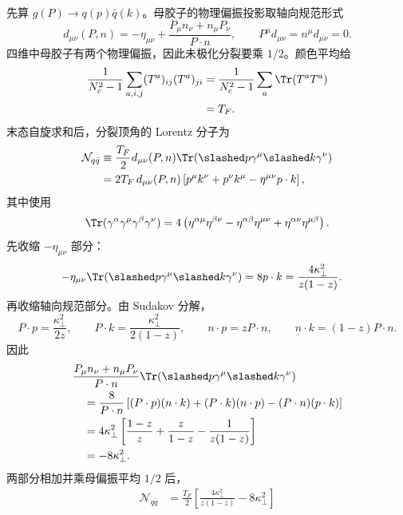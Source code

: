\begin{derivation}[最低阶部分子分裂核]
先算 $g(P)\to q(p)\bar q(k)$。母胶子的物理偏振投影取轴向规范形式
\begin{equation*}
 d_{\mu\nu}(P,n)
 =-\eta_{\mu\nu}
 +\frac{P_\mu n_\nu+n_\mu P_\nu}{P\cdot n},
 \qquad
 P^\mu d_{\mu\nu}=n^\mu d_{\mu\nu}=0.
\end{equation*}
四维中母胶子有两个物理偏振，因此未极化分裂要乘 $1/2$。颜色平均给
\begin{align*}
 \frac1{N_c^2-1}\sum_{a,i,j}
 (T^a)_{ij}(T^a)_{ji}
 &=\frac1{N_c^2-1}\sum_a\Tr(T^aT^a)\\
 &=T_F.
\end{align*}
末态自旋求和后，分裂顶角的 Lorentz 分子为
\begin{align*}
 \mathcal N_{q\bar q}
 &\equiv\frac{T_F}{2}
 d_{\mu\nu}(P,n)
 \Tr\!\left(\slashed p\gamma^\mu\slashed k\gamma^\nu\right)\\
 &=2T_F\,d_{\mu\nu}(P,n)
 \left[p^\mu k^\nu+p^\nu k^\mu
 -\eta^{\mu\nu}p\cdot k\right],
\end{align*}
其中使用
\begin{equation*}
 \Tr(\gamma^\alpha\gamma^\mu\gamma^\beta\gamma^\nu)
 =4\left(
 \eta^{\alpha\mu}\eta^{\beta\nu}
 -\eta^{\alpha\beta}\eta^{\mu\nu}
 +\eta^{\alpha\nu}\eta^{\mu\beta}
 \right).
\end{equation*}
先收缩 $-\eta_{\mu\nu}$ 部分：
\begin{align*}
 -\eta_{\mu\nu}
 \Tr(\slashed p\gamma^\mu\slashed k\gamma^\nu)
 &=8p\cdot k
 =\frac{4\kappa_\perp^2}{z(1-z)}.
\end{align*}
再收缩轴向规范部分。由 Sudakov 分解，
\begin{equation*}
 P\cdot p=\frac{\kappa_\perp^2}{2z},\qquad
 P\cdot k=\frac{\kappa_\perp^2}{2(1-z)},\qquad
 n\cdot p=zP\cdot n,\qquad
 n\cdot k=(1-z)P\cdot n.
\end{equation*}
因此
\begin{align*}
 &\frac{P_\mu n_\nu+n_\mu P_\nu}{P\cdot n}
 \Tr(\slashed p\gamma^\mu\slashed k\gamma^\nu)\\
 &\quad=\frac{8}{P\cdot n}
 \left[(P\cdot p)(n\cdot k)
 +(P\cdot k)(n\cdot p)
 -(P\cdot n)(p\cdot k)\right]\\
 &\quad=4\kappa_\perp^2
 \left[\frac{1-z}{z}+\frac{z}{1-z}
 -\frac1{z(1-z)}\right]\\
 &\quad=-8\kappa_\perp^2.
\end{align*}
两部分相加并乘母偏振平均 $1/2$ 后，
\begin{align*}
 \mathcal N_{q\bar q}
 &=\frac{T_F}{2}
 \left[
 \frac{4\kappa_\perp^2}{z(1-z)}
 -8\kappa_\perp^2
 \right]\\

\end{align*}
\end{derivation}
